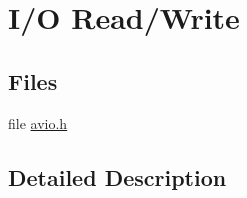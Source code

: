 \hypertarget{group__lavf__io}{}\section{I/O Read/\+Write}
\label{group__lavf__io}
\subsection*{Files}
\begin{DoxyCompactItemize}
\item 
file \hyperlink{avio_8h}{avio.\+h}
\end{DoxyCompactItemize}


\subsection{Detailed Description}
